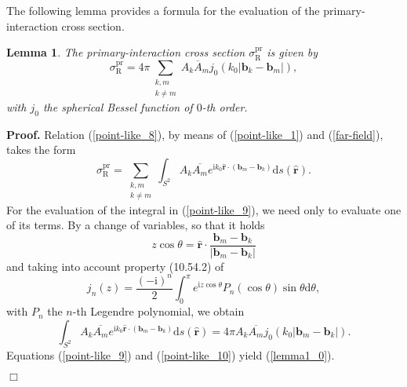 \documentclass{article}
\newtheorem{lemma}{Lemma}
\begin{document}
The following lemma provides a formula for the evaluation of the primary-interaction cross section.
\begin{lemma}
    The primary-interaction cross section $\sigma_{\mathrm{R}}^{\mathrm{pr}}$ is given by
%
    \begin{equation}
        \label{lemma1_0}
        \sigma_{\mathrm{R}}^{\mathrm{pr}}=4\pi\sum_{\substack{k,m\\k\ne m}}A_k\overline{A}_mj_0(k_0\lvert\mathbf{b}_k-\mathbf{b}_m\rvert),
    \end{equation}
%
with $j_0$ the spherical Bessel function of $0$-th order.
%
\end{lemma}
%
\textbf{Proof.}
%
Relation (\ref{point-like_8}), by means of (\ref{point-like_1}) and (\ref{far-field}), takes the form
%
\begin{equation}
    \label{point-like_9}
    \sigma_{\mathrm{R}}^{\mathrm{pr}}=\sum_{\substack{k,m\\k\ne m}}\int_{S^2}A_k\overline{A_m}e^{\mathrm{i}k_0\hat{\mathbf{r}}\cdot(\mathbf{b}_m-\mathbf{b}_k)}\mathrm{d}s(\hat{\mathbf{r}}).
\end{equation}
%
For the evaluation of the integral in (\ref{point-like_9}), we need only to evaluate one of its terms. By a change of variables, so that it holds 
%
$$z\cos{\theta}=\hat{\mathbf{r}}\cdot\frac{\mathbf{b}_m-\mathbf{b}_k}{\lvert\mathbf{b}_m-\mathbf{b}_k\rvert}$$
%
and taking into account property (10.54.2) of \cite{NIST}
\begin{equation}
    j_n(z)=\frac{(-\mathrm{i})^n}{2}\int_{0}^{\pi}e^{\mathrm{i}z\cos{\theta}}P_n(\cos{\theta})\sin{\theta}\mathrm{d}\theta,
\end{equation}
%
with $P_n$ the $n$-th Legendre polynomial, we obtain
%
\begin{equation}
    \label{point-like_10}
\int_{S^2}A_k\overline{A_m}e^{\mathrm{i}k_0\hat{\mathbf{r}}\cdot(\mathbf{b}_m-\mathbf{b}_k)}\mathrm{d}s(\hat{\mathbf{r}})=4\pi A_k\overline{A_m}j_0(k_0\lvert\mathbf{b}_m-\mathbf{b}_k\rvert).
\end{equation}
%
Equations (\ref{point-like_9}) and (\ref{point-like_10}) yield (\ref{lemma1_0}).
 \begin{flushright}$\Box$\end{flushright}
\end{document}
